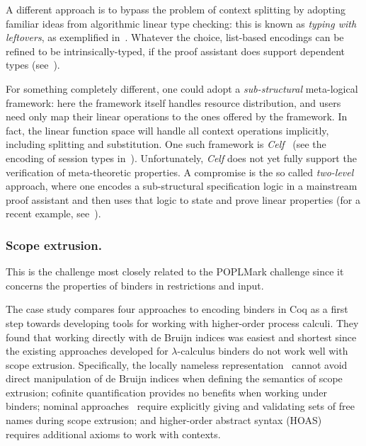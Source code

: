 \documentclass[runningheads]{llncs}
\begin{document}
A different approach is to bypass the problem of context splitting by adopting familiar ideas from algorithmic linear type checking: this is known as \emph{typing with leftovers}, as exemplified in~\cite{DBLP:conf/forte/ZalakainD21}.
Whatever the choice, list-based encodings can be refined to be intrinsically-typed, if the proof assistant does support dependent types (see~\cite{Thiemann2019,CicconeP20,RouvoetPKV20}).

For something completely different, one could adopt a \emph{sub-structural} meta-logical framework: here the framework itself handles resource distribution, and users need only map their linear operations to the ones offered by the framework.
In fact, the linear function space will handle all context operations implicitly, including splitting and substitution.
One such framework is \emph{Celf}~\cite{Schack-Nielsen:IJCAR08} (see the encoding of session types in~\cite{Bock2016}).
Unfortunately, \emph{Celf} does not yet fully support the verification of meta-theoretic properties.
A compromise is the so called \emph{two-level} approach, where one encodes a sub-structural specification logic in a mainstream proof assistant and then uses that logic to state and prove linear properties (for a recent example, see~\cite{Felty:MSCS21}).


\subsubsection{Scope extrusion.}
This is the challenge most closely related to the POPLMark challenge
since it concerns the properties of binders in restrictions and input.

The case study \cite{AmbalLS21} compares four approaches to encoding binders in Coq as a first step towards developing tools for working with higher-order process calculi.
They found that working directly with de Bruijn indices was easiest and shortest since the existing approaches developed for $\lambda$-calculus binders do not work well with scope extrusion.
Specifically, the locally nameless representation~\cite{Chargueraud2012} cannot avoid direct manipulation of de Bruijn indices when defining the semantics of scope extrusion; cofinite quantification provides no benefits when working under binders; nominal approaches~\cite{Pitts2003} require explicitly giving and validating sets of free names during scope extrusion; and higher-order abstract syntax (HOAS)~\cite{Pfenning1988} requires additional axioms to work with contexts.
\end{document}
